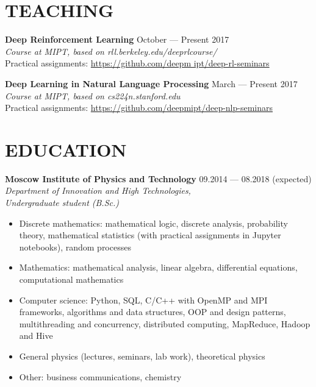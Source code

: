 \documentclass[margin, 9pt]{res} %
\begin{document}
\begin{resume}

\section{TEACHING}

\textbf{Deep Reinforcement Learning} \hfill October --- Present 2017\\
{\sl Course at MIPT, based on rll.berkeley.edu/deeprlcourse/}\\
Practical assignments: \href{https://github.com/deepmipt/deep-rl-seminars}{https://github.com/deepm ipt/deep-rl-seminars}

\textbf{Deep Learning in Natural Language Processing} \hfill March --- Present 2017\\
{\sl Course at MIPT, based on cs224n.stanford.edu}\\
Practical assignments: \href{https://github.com/deepmipt/deep-nlp-seminars}{https://github.com/deepmipt/deep-nlp-seminars}


\section{EDUCATION}
\textbf{Moscow Institute of Physics and Technology} \hfill 09.2014 --- 08.2018 (expected) \\
{\sl Department of Innovation and High Technologies, \\
Undergraduate student (B.Sc.)}
\begin{itemize}
\item Discrete mathematics: mathematical logic, discrete analysis, probability theory, mathematical statistics (with practical assignments in Jupyter notebooks), random processes
\item Mathematics: mathematical analysis, linear algebra, differential equations, computational mathematics
\item Computer science: Python, SQL, C/C++ with OpenMP and MPI frameworks, algorithms and data structures, OOP and design patterns, multithreading and concurrency, distributed computing, MapReduce, Hadoop and Hive
\item General physics (lectures, seminars, lab work), theoretical physics
\item Other: business communications, chemistry
\end{itemize}


\end{resume}
\end{document}
